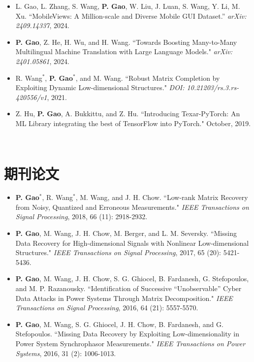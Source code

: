\documentclass{resume}
\begin{document}
\begin{itemize}[parsep=0.2ex]
\item {L. Gao, L. Zhang, S. Wang, {\bf P. Gao}, W. Liu, J. Luan, S. Wang, Y. Li, M. Xu. ``MobileViews: A Million-scale and Diverse Mobile GUI Dataset.'' \emph{arXiv: 2409.14337}, 2024.}

\item {{\bf P. Gao}, Z. He, H. Wu, and H. Wang. ``Towards Boosting Many-to-Many Multilingual Machine Translation with Large Language Models." \emph{arXiv: 2401.05861}, 2024.}

\item {R. Wang$^*$, {\bf P. Gao}$^*$, and M. Wang. ``Robust Matrix Completion by Exploiting Dynamic Low-dimensional Structures." \emph{DOI: 10.21203/rs.3.rs-420556/v1}, 2021.}

\item {Z. Hu, {\bf P. Gao}, A. Bukkittu, and Z. Hu. ``Introducing Texar-PyTorch: An ML Library integrating the best of TensorFlow into PyTorch." October, 2019.}

\end{itemize}

\

\section{期刊论文}

\begin{itemize}[parsep=0.2ex]

\item {{\bf P. Gao}$^*$, R. Wang$^*$, M. Wang, and J. H. Chow. ``Low-rank Matrix Recovery from Noisy, Quantized and Erroneous Measurements." \emph{IEEE Transactions on Signal Processing}, 2018, 66 (11): 2918-2932.}

\item {{\bf P. Gao}, M. Wang, J. H. Chow, M. Berger, and L. M. Seversky. ``Missing Data Recovery for High-dimensional Signals with Nonlinear Low-dimensional Structures." \emph{IEEE Transactions on Signal Processing}, 2017, 65 (20): 5421-5436.}

\item {{\bf P. Gao}, M. Wang, J. H. Chow, S. G. Ghiocel, B. Fardanesh, G. Stefopoulos, and M. P. Razanousky. ``Identification of Successive ``Unobservable'' Cyber Data Attacks in Power Systems Through Matrix Decomposition." \emph{IEEE Transactions on Signal Processing}, 2016, 64 (21): 5557-5570.}

\item {{\bf P. Gao}, M. Wang, S. G. Ghiocel, J. H. Chow, B. Fardanesh, and G. Stefopoulos. ``Missing Data Recovery by Exploiting Low-dimensionality in Power System Synchrophasor Measurements." \emph{IEEE Transactions on Power Systems}, 2016, 31 (2): 1006-1013.}
\end{itemize}
\end{document}
